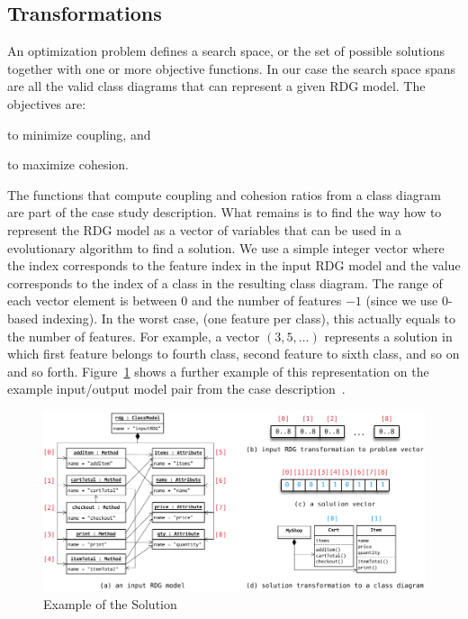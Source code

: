 \subsection{Transformations}

An optimization problem defines a search space, or the set of possible solutions together with one or more objective functions.
In our case the search space spans are all the valid class diagrams that can represent a given RDG model.
The objectives are:
%
\begin{inparaenum}[(1)]
\item to minimize coupling, and
\item to maximize cohesion.     
\end{inparaenum}

The functions that compute coupling and cohesion ratios from a class diagram are part of the case study description.
What remains is to find the way how to represent the RDG model as a vector of variables that can be used in a evolutionary algorithm to find a solution.
We use a simple integer vector where the index corresponds to the feature index in the input RDG model and the value corresponds to the index of a class in the resulting class diagram.
The range of each vector element is between 0 and the number of features $- 1$ (since we use 0-based indexing).
In the worst case, (\Ie one feature per class), this actually equals to the number of features. 
For example, a vector $\left( 3, 5, \dots \right)$ represents a solution in which first feature belongs to fourth class, second feature to sixth class, and so on and so forth.
Figure~\ref{fig:SolutionOverview} shows a further example of this representation on the example input/output model pair from the case description~\cite{Fleck2016}.

\begin{figure}[h!tb]
  \centering
  \includegraphics[width=.9\columnwidth]{figures/solution-overview.pdf}
  \caption{Example of the Solution}
  \label{fig:SolutionOverview}
\end{figure}

